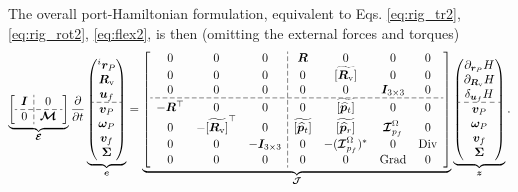 \documentclass{svjour3}                     %
\DeclareMathOperator*{\Grad}{Grad}
\DeclareMathOperator*{\Div}{Div}
\newcommand{\crmat}[1]{\ensuremath{\widetilde{\left[#1\right]}}}
\begin{document}
The overall port-Hamiltonian formulation, equivalent to Eqs. \eqref{eq:rig_tr2}, \eqref{eq:rig_rot2}, \eqref{eq:flex2}, is then (omitting the external forces and torques)
\begin{equation}
\label{eq:ph_mfd_all}
\setlength{\dashlinegap}{2pt}
\underbrace{
	{\left[ \begin{array}{c:c}
		\bm{I} & 0 \\
		\hdashline
		0 & \bm{\mathcal{M}} \\
		\end{array} \right]}
}_{\bm{\mathcal{E}}}
\diffp{}{t}
\underbrace{
	\begin{pmatrix}
	^i \bm{r}_P \\ \bm{R}_{\text{v}} \\ \bm{u}_f \\\hdashline  \bm{v}_P \\ \bm\omega_P  \\ \bm{v}_f  \\ \bm\Sigma \\
	\end{pmatrix}
}_{\bm{e}} = 
\underbrace{
	{\left[ \begin{array}{ccc:cccc}
		0 & 0 & 0 &  \bm{R} & 0 & 0 & 0 \\
		0 & 0 & 0 & 0 & \crmat{\bm{R}_{\text{v}}} & 0 & 0 \\
		0 & 0 & 0 & 0 & 0 & \bm{I}_{3\times 3} & 0  \\ 
		\hdashline
		-\bm{R}^\top & 0 & 0 & 0 & \crmat{\widehat{\bm{p}}_t} & 0 & 0 \\
		0 & -\crmat{\bm{R}_{\text{v}}}^\top & 0 & \crmat{\widehat{\bm{p}}_t} & \crmat{\widehat{\bm{p}}_r} & \bm{\mathcal{I}}_{p_f}^\Omega & 0 \\
		0 & 0 & -\bm{I}_{3\times 3} & 0 & -(\bm{\mathcal{I}}_{p_f}^\Omega)^* & 0 & \Div \\
		0 & 0 & 0 & 0 & 0 & \Grad & 0 \\
		\end{array} \right]}
}_{\bm{\mathcal{J}}}
\underbrace{\begin{pmatrix}
	\partial_{\bm{r}_P}H \\ \partial_{\bm{R}_\text{v}}H \\ \delta_{\bm{u}_f} H \\\hdashline  \bm{v}_P \\ \bm\omega_P  \\ \bm{v}_f  \\ \bm\Sigma \\
	\end{pmatrix}}_{\bm{z}}.
\end{equation} 
\end{document}
